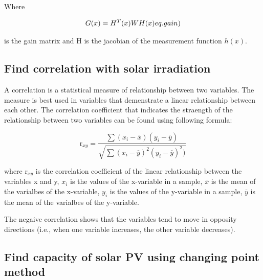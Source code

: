 Where

\begin{equation}
  G(x)=H^{T}(x)WH(x)
  \label(eq.gain)
\end{equation}

is the gain matrix and H is the jacobian of the measurement function $h(x)$.

\subsection{Find correlation with solar irradiation}

A correlation is a statistical measure of relationship between two variables. The measure is best used in variables that demenstrate a linear relationship between each other.
The correlation coefficient that indicates the straength of the relationship between two variables can be found using following formula:

\begin{equation}
  \text{r}_{xy} =\frac{\sum(x_{i}-\overline{x})(y_{i}-\overline{y})}{\sqrt{\sum(x_{i}-\overline{y})^{2}(y_{i}-\overline{y})^{2})}}
  \label{eq.corr}
\end{equation}

where $\text{r}_{xy}$ is the correlation coefficient of the linear relationship between the variables x and y, $x_{i}$ is the values of the x-variable in a sample, $\overline{x}$ is the mean of the varialbes of the x-variable,
$y_{i}$ is the values of the y-variable in a sample, $\overline{y}$ is the mean of the varialbes of the y-variable.

The negaive correlation shows that the variables tend to move in opposity directions (i.e., when one variable increases, the other variable decreases).

\subsection{Find capacity of solar PV using changing point method}
